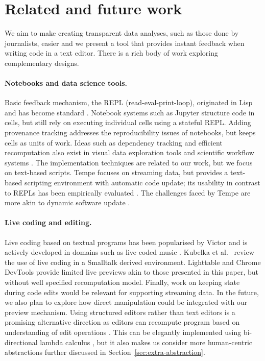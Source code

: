 \documentclass[english,submission]{programming}
\theoremstyle{plain}
\theoremstyle{definition}
\begin{document}

\section{Related and future work}
\label{sec:future}

We aim to make creating transparent data analyses, such as those done by journalists, easier and we
present a tool that provides instant feedback when writing code in a text editor.
There is a rich body of work exploring complementary designs.

\paragraph{Notebooks and data science tools.}
Basic feedback mechanism, the REPL (read-eval-print-loop), originated in Lisp
\cite{lisp} and has become standard \cite{drscheme}. Notebook systems
such as Jupyter \cite{rmarkdown,jupyter,ipython} structure code in cells,
but still rely on executing individual cells using a stateful REPL.
Adding provenance tracking \cite{dataflow,noworkflow,wrattler} addresses
the reproducibility issues of notebooks, but keeps cells as units of work. Ideas such as
dependency tracking and efficient recomputation also exist in visual data exploration tools
\cite{control,tableau,vizdom} and scientific workflow systems \cite{taverna,kepler}. The
implementation techniques are related to our work, but we focus on text-based scripts.
Tempe \cite{tempe} focuses on streaming data, but provides a text-based scripting environment
with automatic code update; its usability in contrast to REPLs has been empirically
evaluated \cite{ripple}. The challenges faced by Tempe are more akin to dynamic software update \cite{dsu}.

\paragraph{Live coding and editing.}
Live coding based on textual programs has been popularised by Victor \cite{principle,learnable} and
is actively developed in domains such as live coded music \cite{beyond,sonic}. Kubelka et al.~\cite{liveroad}
review the use of live coding in a Smalltalk derived environment. Lighttable \cite{lighttable}
and Chrome DevTools provide limited live previews akin to those presented in this paper,
but without well specified recomputation model. Finally, work on keeping state during
code edits \cite{alive,livingit} would be relevant for supporting streaming data. In the future,
we also plan to explore how direct manipulation \cite{direct} could be integrated with our preview
mechanism.
%
Using structured editors \cite{structure-based} rather than text editors is a promising alternative
direction as editors can recompute program based on understanding of edit operations
\cite{interactive,livenut,lamdu}. This can be elegantly implemented using bi-directional
lambda calculus \cite{hazelnut}, but it also makes us consider more human-centric abstractions
\cite{subtext,directprog} further discussed in Section~\ref{sec:extra-abstraction}.
\end{document}
